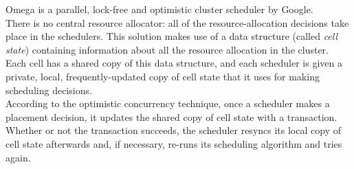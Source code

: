 Omega \cite{omega} is a parallel, lock-free and optimistic cluster scheduler by Google.\\
There is no central resource allocator: all of the resource-allocation decisions take place in the schedulers. This solution makes use of a data structure (called \textit{cell state}) containing information about all the resource allocation in the cluster. Each cell has a shared copy of this data structure, and each scheduler is given a private, local, frequently-updated copy of cell state that it uses for making scheduling decisions.\\
According to the optimistic concurrency technique, once a scheduler makes a placement decision, it updates the shared copy of cell state with a transaction. Whether or not the transaction succeeds, the scheduler resyncs its local copy of cell state afterwards and, if necessary, re-runs its scheduling algorithm and tries again.